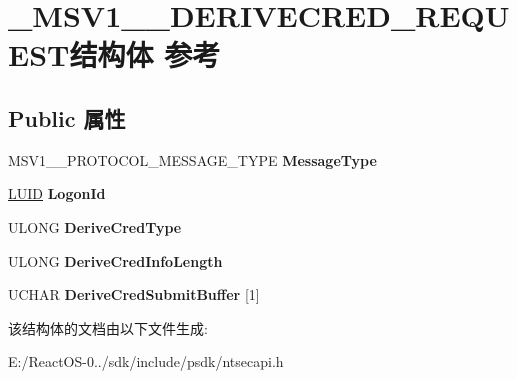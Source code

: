 \hypertarget{struct___m_s_v1__0___d_e_r_i_v_e_c_r_e_d___r_e_q_u_e_s_t}{}\section{\+\_\+\+M\+S\+V1\+\_\+\_\+\+D\+E\+R\+I\+V\+E\+C\+R\+E\+D\+\_\+\+R\+E\+Q\+U\+E\+S\+T结构体 参考}
\label{struct___m_s_v1__0___d_e_r_i_v_e_c_r_e_d___r_e_q_u_e_s_t}
\subsection*{Public 属性}
\begin{DoxyCompactItemize}
\item 
\mbox{\label{struct___m_s_v1__0___d_e_r_i_v_e_c_r_e_d___r_e_q_u_e_s_t_acd202d44feacc886fbfc3881aa25f092}} 
M\+S\+V1\+\_\+\_\+\+P\+R\+O\+T\+O\+C\+O\+L\+\_\+\+M\+E\+S\+S\+A\+G\+E\+\_\+\+T\+Y\+PE {\bfseries Message\+Type}
\item 
\mbox{\label{struct___m_s_v1__0___d_e_r_i_v_e_c_r_e_d___r_e_q_u_e_s_t_ad2ffada2655b835924915110bfa736e5}} 
\hyperlink{struct___l_u_i_d}{L\+U\+ID} {\bfseries Logon\+Id}
\item 
\mbox{\label{struct___m_s_v1__0___d_e_r_i_v_e_c_r_e_d___r_e_q_u_e_s_t_a7434cf2ac508a10d841dc7a4fcacfd8d}} 
U\+L\+O\+NG {\bfseries Derive\+Cred\+Type}
\item 
\mbox{\label{struct___m_s_v1__0___d_e_r_i_v_e_c_r_e_d___r_e_q_u_e_s_t_a3c68104a7ab59aaac53a2235f4beef85}} 
U\+L\+O\+NG {\bfseries Derive\+Cred\+Info\+Length}
\item 
\mbox{\label{struct___m_s_v1__0___d_e_r_i_v_e_c_r_e_d___r_e_q_u_e_s_t_a2ee1d190f6ccbac039f8bae4670f9855}} 
U\+C\+H\+AR {\bfseries Derive\+Cred\+Submit\+Buffer} \mbox{[}1\mbox{]}
\end{DoxyCompactItemize}


该结构体的文档由以下文件生成\+:\begin{DoxyCompactItemize}
\item 
E\+:/\+React\+O\+S-\/0../sdk/include/psdk/ntsecapi.\+h\end{DoxyCompactItemize}
